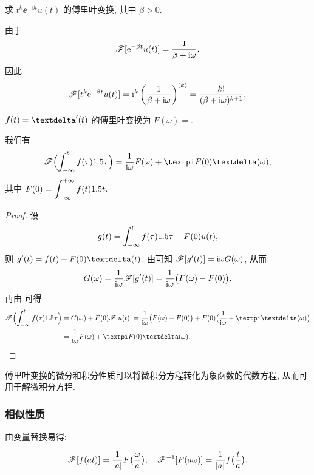 \begin{example}\label{exam:fourier-transform-power-rational}
  求 $t^k \ee^{-\beta t}u(t)$ 的傅里叶变换, 其中 $\beta>0$.
\end{example}

\begin{solution}
  由于
  \[
    \mathscr{F}[\mathrm{e}^{-\beta t}u(t)]=\frac{1}{\beta+\mathrm{i} \omega},
  \]
  因此
  \[
    \mathscr{F}[t^k\mathrm{e}^{-\beta t}u(t)]=\mathrm{i}^k\left(\frac1{\beta+\mathrm{i} \omega}\right)^{(k)}
    =\frac{k!}{(\beta+\mathrm{i} \omega)^{k+1}}.
  \]
\end{solution}

\begin{exercise}
  $f(t)=\dirac'(t)$ 的傅里叶变换为 $F(\omega)=$\fillblank{}.
\end{exercise}

\begin{theorem}[积分性质]
  \label{thm:fourier-integral-property}
  我们有
  \[
    \msf\Bigl(\int_{-\infty}^t f(\tau)\d\tau\Bigr)
    =\frac1{\ii \omega}F(\omega)+\cpi F(0)\dirac(\omega),
  \]
  其中 $F(0)=\displaystyle\int_{-\infty}^{+\infty} f(t)1.5 t$.
\end{theorem}

\begin{proof}
  设
  \[
    g(t)=\int_{-\infty}^t f(\tau)1.5 \tau-F(0)u(t),
  \]
  则 $g'(t)=f(t)-F(0)\dirac(t)$.
  由\thmFDif 可知 $\mathscr{F}[g'(t)]=\mathrm{i} \omega G(\omega)$, 从而
  \[
    G(\omega)=\frac1{\mathrm{i} \omega}\mathscr{F}[g'(t)]
    =\frac1{\mathrm{i} \omega}\bigl(F(\omega)-F(0)\bigr).
  \]
  再由 可得
  \begin{align*}
    \msf\Bigl(\int_{-\infty}^t f(\tau)\d\tau\Bigr)
    &=G(\omega)+F(0)\msf[u(t)]
    =\frac1{\ii \omega}\bigl(F(\omega)-F(0)\bigr)+F(0)\bigl(\frac1{\ii \omega}+\cpi\dirac(\omega)\bigr)\\
    &=\frac1{\ii \omega}F(\omega)+\cpi F(0)\dirac(\omega).\qedhere
  \end{align*}
\end{proof}

傅里叶变换的微分和积分性质可以将微积分方程转化为象函数的代数方程, 从而可用于解微积分方程.


\subsubsection{相似性质}

由变量替换易得:
\begin{theorem}[相似性质]
  \label{thm:fourier-similar-property}
  \[
    \mathscr{F}[f(at)]=\frac1{\lvert a\rvert}F\bigl(\frac\omega a\bigr),\quad
    \mathscr{F}^{-1}[F(a\omega)]=\frac1{\lvert a\rvert}f\bigl(\frac t a\bigr).
  \]
\end{theorem}

